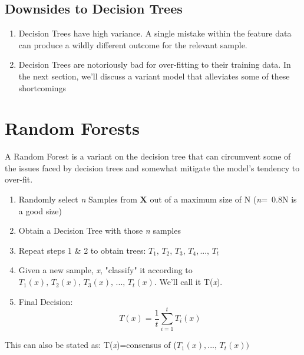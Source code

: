 \documentclass{article}
\theoremstyle{definition}
\begin{document}
\subsection{Downsides to Decision Trees}
\begin{enumerate}[-]

\item
Decision Trees have high variance. A single mistake within the feature data can produce a wildly \qquad different outcome for the relevant sample. \newline
\item
Decision Trees are notoriously bad for over-fitting to their training data. In the next section, we'll discuss a variant model that alleviates some of these shortcomings
\end{enumerate}

\section{Random Forests}
A Random Forest is a variant on the decision tree that can circumvent some of the issues faced by decision trees and somewhat mitigate the model's tendency to over-fit.
\begin{enumerate}[(1)]
\item
 Randomly select \textit{n} Samples from \textbf{X} out of a maximum size of N (\textit{n}=~0.8N is a good size)
\item
Obtain a Decision Tree with those \textit{n} samples
\item
Repeat steps 1 \& 2 to obtain trees:  $T_1,\,T_2,\,T_3,\,T_4,...,\, T_\textit{t}$
\item
Given a new sample, \textit{x}, "classify" it according to $T_1(\textit{x}),\,T_2(\textit{x}),\,T_3(\textit{x}),\,...,\,T_\textit{t}(\textit{x})$. We'll call it T(\textit{x}).
\item
Final Decision: $$T(\textit{x})=\frac{1}{\textit{t}}\sum_{i=1}^{\textit{t}} T_i(\textit{x})$$
\end{enumerate}
This can also be stated as: \qquad T(\textit{x})=consensus of ($T_1(\textit{x}),...,\,T_\textit{t}(\textit{x}))$
\end{document}

